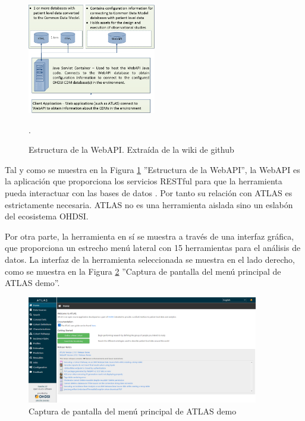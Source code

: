 \begin{figure}[H]
    \centering
    \includegraphics[width=0.50\textwidth]{figures/webAPIwiki.png}
     \caption{Estructura de la WebAPI. Extraída de la wiki de github \cite{githubWebAPIwiki}}.
    \label{fig:webAPIwiki}
\end{figure}

Tal y como se muestra en la Figura \ref{fig:webAPIwiki} ''Estructura de la WebAPI'', la WebAPI es la aplicación que proporciona los servicios RESTful para que la herramienta pueda interactuar con las bases de datos \cite{githubWebAPIwiki}. Por tanto su relación con ATLAS es estrictamente necesaria. ATLAS no es una herramienta aislada sino un eslabón del ecosistema OHDSI.

Por otra parte, la herramienta en sí se muestra a través de una interfaz gráfica, que proporciona un estrecho menú lateral con 15 herramientas para el análisis de datos. La interfaz de la herramienta seleccionada se muestra en el lado derecho, como se muestra en la Figura \ref{fig:ATLASdemoHome} ''Captura de pantalla del menú principal de ATLAS demo''.

\begin{figure}[H]
\centering
\includegraphics[width=0.90\textwidth]{figures/ATLASdemoHome.png}
     \caption{Captura de pantalla del menú principal de ATLAS demo}
    \label{fig:ATLASdemoHome}
\end{figure}

